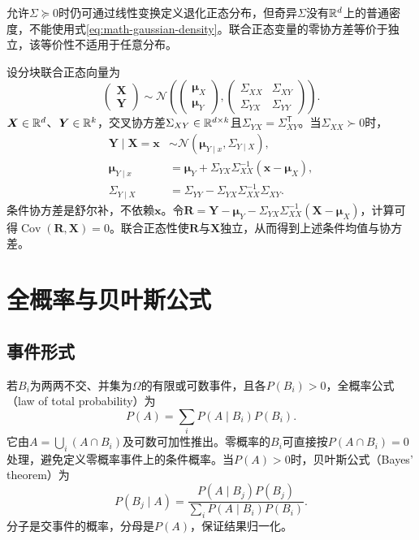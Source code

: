 允许$\Sigma\succeq0$时仍可通过线性变换定义退化正态分布，但奇异$\Sigma$没有$\mathbb{R}^d$上的普通密度，不能使用式\eqref{eq:math-gaussian-density}。联合正态变量的零协方差等价于独立，该等价性不适用于任意分布。

设分块联合正态向量为
\begin{equation}
 \begin{pmatrix}\bm X\\\bm Y\end{pmatrix}\sim\mathcal N\left(
 \begin{pmatrix}\bm\mu_X\\\bm\mu_Y\end{pmatrix},
 \begin{pmatrix}\Sigma_{XX}&\Sigma_{XY}\\\Sigma_{YX}&\Sigma_{YY}\end{pmatrix}\right).
\end{equation}
$\bm X\in\mathbb{R}^d$、$\bm Y\in\mathbb{R}^k$，交叉协方差$\Sigma_{XY}\in\mathbb{R}^{d\times k}$且$\Sigma_{YX}=\Sigma_{XY}^{\mathsf T}$。当$\Sigma_{XX}\succ0$时，
\begin{align}
 \bm Y\mid\bm X=\bm x&\sim\mathcal N(\bm\mu_{Y\mid x},\Sigma_{Y\mid X}),\\
 \bm\mu_{Y\mid x}&=\bm\mu_Y+\Sigma_{YX}\Sigma_{XX}^{-1}(\bm x-\bm\mu_X),\\
 \Sigma_{Y\mid X}&=\Sigma_{YY}-\Sigma_{YX}\Sigma_{XX}^{-1}\Sigma_{XY}.
\end{align}
条件协方差是舒尔补，不依赖$\bm x$。令$\bm R=\bm Y-\bm\mu_Y-\Sigma_{YX}\Sigma_{XX}^{-1}(\bm X-\bm\mu_X)$，计算可得$\operatorname{Cov}(\bm R,\bm X)=0$。联合正态性使$\bm R$与$\bm X$独立，从而得到上述条件均值与协方差。

\section{全概率与贝叶斯公式}
\subsection{事件形式}
若$B_i$为两两不交、并集为$\Omega$的有限或可数事件，且各$P(B_i)>0$，全概率公式（law of total probability）为
\begin{equation}
 P(A)=\sum_iP(A\mid B_i)P(B_i).
\end{equation}
它由$A=\bigcup_i(A\cap B_i)$及可数可加性推出。零概率的$B_i$可直接按$P(A\cap B_i)=0$处理，避免定义零概率事件上的条件概率。当$P(A)>0$时，贝叶斯公式（Bayes' theorem）为
\begin{equation}
 P(B_j\mid A)=\frac{P(A\mid B_j)P(B_j)}{\sum_iP(A\mid B_i)P(B_i)}.
\end{equation}
分子是交事件的概率，分母是$P(A)$，保证结果归一化。

